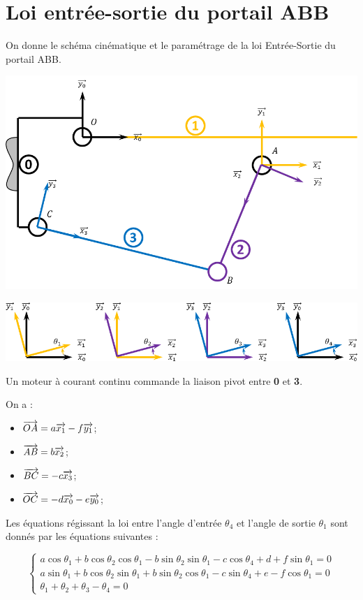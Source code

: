 \documentclass[10pt,fleqn]{article} %
\begin{document}



\section{Loi entrée-sortie du portail ABB}
On donne le schéma cinématique et le paramétrage de la loi Entrée-Sortie du portail ABB.

\begin{center}
\includegraphics[width=.7\linewidth]{images/Schema}

\includegraphics[width=.8\linewidth]{images/Parametrage}
\end{center}

Un moteur à courant continu commande la liaison pivot entre \textbf{0} et \textbf{3}.  


On a : 
\begin{multicols}{2}
\begin{itemize}
\item $\overrightarrow{OA} = a \overrightarrow{x_{1}}-f \overrightarrow{y_{1}}$;
\item $\overrightarrow{AB} = b \overrightarrow{x_{2}}$;
\item $\overrightarrow{BC} = -c \overrightarrow{x_{3}}$;
\item $\overrightarrow{OC} = -d \overrightarrow{x_{0}}-e\overrightarrow{y_{0}}$;
\end{itemize}
\end{multicols}
 
Les équations régissant la loi entre l'angle d'entrée $\theta_4$ et l'angle de sortie $\theta_1$ sont donnés par les équations suivantes : 

$$
\left\{
\begin{array}{l}
a \cos \theta_1 + b\cos \theta_2 \cos \theta_1 
-b \sin\theta_2 \sin\theta_1 - c \cos \theta_4  
+d 
+f\sin \theta_1 
 =0  \\
a \sin\theta_1 + b\cos \theta_2 \sin\theta_1 + b\sin\theta_2 \cos \theta_1  
- c \sin\theta_4 +e 
-f\cos \theta_1 = 0  \\
\theta_1 +\theta_2 + \theta_3 - \theta_4 = 0
\end{array}
\right.
$$
\end{document}
